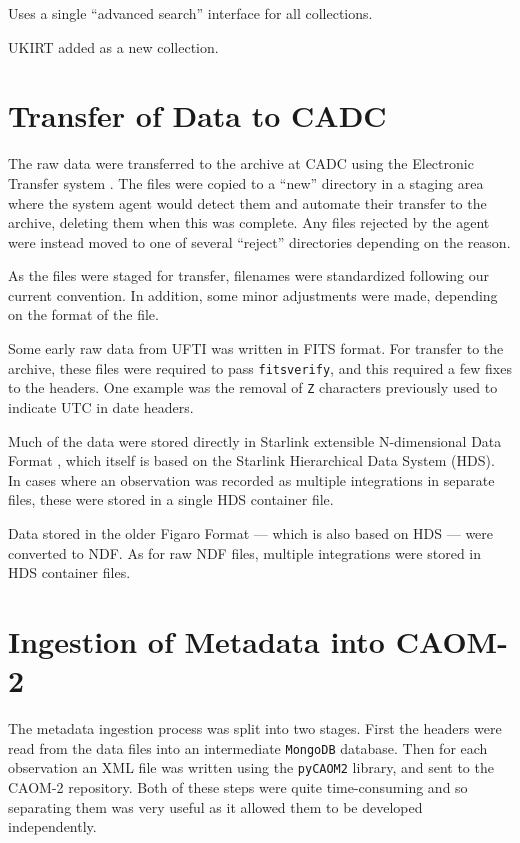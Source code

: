 \documentclass[11pt,twoside]{article}
\begin{document}
Uses a single ``advanced search'' interface for all collections.

UKIRT added as a new collection.

\section{Transfer of Data to CADC}

The raw data were transferred to the archive at CADC
using the
Electronic Transfer system \citep{2005ASPC..347..647M}.
The files were copied to a ``new'' directory in a
staging area where the system agent would
detect them and automate their transfer to the
archive, deleting them when this was complete.
Any files rejected by the agent were instead moved
to one of several ``reject'' directories depending
on the reason.

As the files were staged for transfer,
filenames were standardized following our current convention.
In addition,
some minor adjustments were made,
depending on the format of the file.


Some early raw data from UFTI was written in FITS format.
For transfer to the archive, these files were
required to pass
\texttt{fitsverify},
and this required a few fixes to the headers.
One example was the removal of \texttt{Z} characters
previously used to indicate UTC in date headers.


Much of the data were stored directly in
Starlink extensible N-dimensional Data Format
\citep[NDF, see for example,][]{P91_adassxxiii},
which itself is based on the
Starlink Hierarchical Data System (HDS).
In cases where an observation was recorded as
multiple integrations in separate files,
these were stored in a single HDS container file.


Data stored in the older Figaro Format
--- which is also based on HDS ---
were converted to NDF.
As for raw NDF files, multiple integrations
were stored in HDS container files.

\section{Ingestion of Metadata into CAOM-2}

The metadata ingestion process was split into two stages.
First the headers were
read from the data files into an intermediate
\texttt{MongoDB} database.
Then for each observation an XML file was written
using the \texttt{pyCAOM2} library,
and sent to the CAOM-2 repository.
Both of these steps were quite time-consuming
and so separating them was very useful
as it allowed them to be developed
independently.
\end{document}
